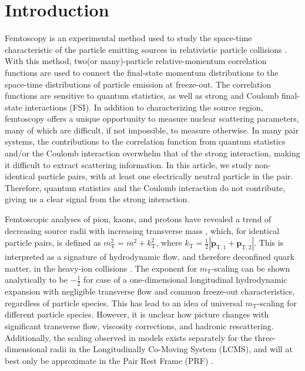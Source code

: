 \documentclass[ALICE,manyauthors]{cernphprep}
\newcommand{\mt}{$m_{\mathrm{T}}$\xspace}
\begin{document}
\section{Introduction}
\label{sec:Introduction}

Femtoscopy is an experimental method used to study the space-time characteristic of the particle emitting sources in relativistic particle collisions \cite{Lisa:2005dd}.  
With this method, two(or many)-particle relative-momentum correlation functions are used to connect the final-state momentum distributions to the space-time distributions of particle emission at freeze-out.  
The correlation functions are sensitive to quantum statistics, as well as strong and Coulomb final-state interactions (FSI).  
In addition to characterizing the source region, femtoscopy offers a unique opportunity to measure nuclear scattering parameters, many of which are difficult, if not impossible, to measure otherwise.  
In many pair systems, the contributions to the correlation function from quantum statistics and/or the Coulomb interaction overwhelm that of the strong interaction, making it difficult to extract scattering information.  
In this article, we study non-identical particle pairs, with at least one electrically neutral particle in the pair.  
Therefore, quantum statistics and the Coulomb interaction do not contribute, giving us a clear signal from the strong interaction.

Femtoscopic analyses of pion, kaons, and protons have revealed a trend of decreasing source radii with increasing transverse mass \cite{Adam:2015vja}, which, for identical particle pairs, is defined as $m_{\mathrm{T}}^{2} = m^{2} + k_{\mathrm{T}}^{2}$, where $k_{\mathrm{T}} = \frac{1}{2}|\mathbf{p}_{\mathrm{T},1} + \mathbf{p}_{\mathrm{T},2}|$.  
This is interpreted as a signature of hydrodynamic flow, and therefore deconfined quark matter, in the heavy-ion collisions \cite{Akkelin:1995gh}. 
The exponent for \mt-scaling can be shown analytically to be $-\frac{1}{2}$ for case of a one-dimensional longitudinal hydrodynamic expansion with negligible transverse flow and common freeze-out characteristics, regardless of particle species.
This has lead to an idea of universal \mt-scaling for different particle species.
However, it is unclear how picture changes with significant transverse flow, viscosity corrections, and hadronic rescattering.
Additionally, the scaling observed in models exists separately for the three-dimensional radii in the Longitudinally Co-Moving System (LCMS), and will at best only be approximate in the Pair Rest Frame (PRF) \cite{Adam:2015vja, Kisiel:2014upa}.
\end{document}
